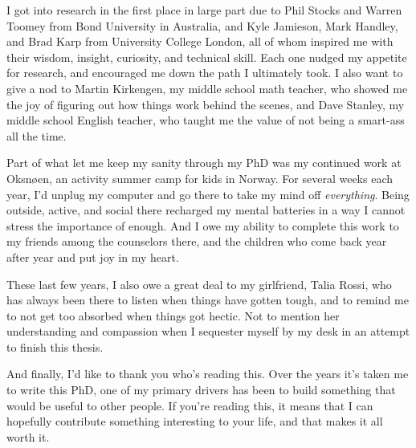 I got into research in the first place in large part due to Phil Stocks and
Warren Toomey from Bond University in Australia, and Kyle Jamieson, Mark
Handley, and Brad Karp from University College London, all of whom inspired me
with their wisdom, insight, curiosity, and technical skill. Each one nudged my
appetite for research, and encouraged me down the path I ultimately took. I also
want to give a nod to Martin Kirkengen, my middle school math teacher, who
showed me the joy of figuring out how things work behind the scenes, and Dave
Stanley, my middle school English teacher, who taught me the value of not being
a smart-ass all the time.

Part of what let me keep my sanity through my PhD was my continued work at
Oksnøen, an activity summer camp for kids in Norway. For several weeks each
year, I'd unplug my computer and go there to take my mind off \emph{everything}.
Being outside, active, and social there recharged my mental batteries in a way I
cannot stress the importance of enough. And I owe my ability to complete this
work to my friends among the counselors there, and the children who come back
year after year and put joy in my heart.

These last few years, I also owe a great deal to my girlfriend, Talia Rossi, who
has always been there to listen when things have gotten tough, and to remind me
to not get too absorbed when things got hectic. Not to mention her understanding
and compassion when I sequester myself by my desk in an attempt to finish this
thesis.

And finally, I'd like to thank you who's reading this. Over the years it's taken
me to write this PhD, one of my primary drivers has been to build something that
would be useful to other people. If you're reading this, it means that I can
hopefully contribute something interesting to your life, and that makes it all
worth it.
